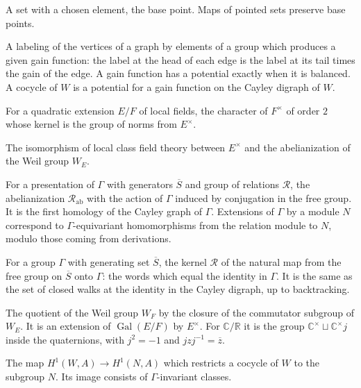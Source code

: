 \documentclass[12pt,letterpaper]{article}
\numberwithin{equation}{section}
\theoremstyle{plain}
\theoremstyle{definition}
\newcommand{\C}{\mathbb{C}}
\newcommand{\R}{\mathbb{R}}
\newcommand{\rel}{\mathcal{R}}            %
\DeclareMathOperator{\Gal}{Gal}
\begin{document}
\begin{description}[itemsep=3pt,leftmargin=1.5em,style=unboxed]
\item[Pointed set.] A set with a chosen element, the base point. Maps of
pointed sets preserve base points.

\item[Potential.] A labeling of the vertices of a graph by elements of a
group which produces a given gain function: the label at the head of each
edge is the label at its tail times the gain of the edge. A gain function
has a potential exactly when it is balanced. A cocycle of $W$ is a
potential for a gain function on the Cayley digraph of $W$.

\item[Quadratic character $\omega_{E/F}$.] For a quadratic extension
$E/F$ of local fields, the character of $F^\times$ of order $2$ whose
kernel is the group of norms from $E^\times$.

\item[Reciprocity map.] The isomorphism of local class field theory
between $E^\times$ and the abelianization of the Weil group $W_E$.

\item[Relation module.] For a presentation of $\Gamma$ with generators
$\overline{S}$ and group of relations $\rel$, the abelianization
$\rel_{\mathrm{ab}}$ with the action of $\Gamma$ induced by conjugation in
the free group. It is the first homology of the Cayley graph of $\Gamma$.
Extensions of $\Gamma$ by a module $N$ correspond to $\Gamma$-equivariant
homomorphisms from the relation module to $N$, modulo those coming from
derivations.

\item[Relations, group of.] For a group $\Gamma$ with generating set
$\overline{S}$, the kernel $\rel$ of the natural map from the free group
on $\overline{S}$ onto $\Gamma$: the words which equal the identity in
$\Gamma$. It is the same as the set of closed walks at the identity in the
Cayley digraph, up to backtracking.

\item[Relative Weil group $W_{E/F}$.] The quotient of the Weil group
$W_F$ by the closure of the commutator subgroup of $W_E$. It is an
extension of $\Gal(E/F)$ by $E^\times$. For $\C/\R$ it is the group
$\C^\times\sqcup\C^\times j$ inside the quaternions, with $j^2=-1$ and
$jzj^{-1}=\overline{z}$.

\item[Restriction.] The map $H^1(W,A)\to H^1(N,A)$ which restricts a
cocycle of $W$ to the subgroup $N$. Its image consists of
$\Gamma$-invariant classes.


\end{description}
\end{document}

